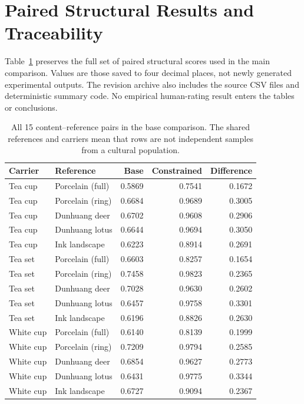 \documentclass[manuscript,acmlarge,screen,review]{acmart}
\begin{document}
\section{Paired Structural Results and Traceability}
\label{sec:appendix}
Table~\ref{tab:allpairs} preserves the full set of paired structural scores used in the main comparison. Values are those saved to four decimal places, not newly generated experimental outputs. The revision archive also includes the source CSV files and deterministic summary code. No empirical human-rating result enters the tables or conclusions.
\begin{table}[h]
\centering
\caption{All 15 content--reference pairs in the base comparison. The shared references and carriers mean that rows are not independent samples from a cultural population.}
\label{tab:allpairs}
\begin{tabular}{@{}llrrr@{}}
\toprule
Carrier & Reference & Base & Constrained & Difference\\
\midrule
Tea cup & Porcelain (full) & 0.5869 & 0.7541 & 0.1672\\
Tea cup & Porcelain (ring) & 0.6684 & 0.9689 & 0.3005\\
Tea cup & Dunhuang deer & 0.6702 & 0.9608 & 0.2906\\
Tea cup & Dunhuang lotus & 0.6644 & 0.9694 & 0.3050\\
Tea cup & Ink landscape & 0.6223 & 0.8914 & 0.2691\\
Tea set & Porcelain (full) & 0.6603 & 0.8257 & 0.1654\\
Tea set & Porcelain (ring) & 0.7458 & 0.9823 & 0.2365\\
Tea set & Dunhuang deer & 0.7028 & 0.9630 & 0.2602\\
Tea set & Dunhuang lotus & 0.6457 & 0.9758 & 0.3301\\
Tea set & Ink landscape & 0.6196 & 0.8826 & 0.2630\\
White cup & Porcelain (full) & 0.6140 & 0.8139 & 0.1999\\
White cup & Porcelain (ring) & 0.7209 & 0.9794 & 0.2585\\
White cup & Dunhuang deer & 0.6854 & 0.9627 & 0.2773\\
White cup & Dunhuang lotus & 0.6431 & 0.9775 & 0.3344\\
White cup & Ink landscape & 0.6727 & 0.9094 & 0.2367\\
\bottomrule
\end{tabular}
\end{table}
\end{document}
